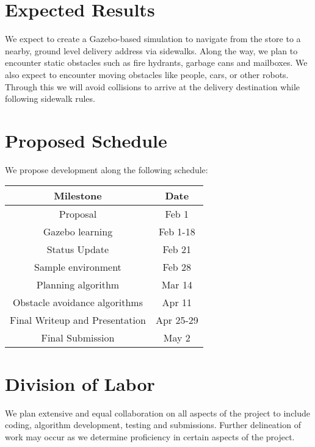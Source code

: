 \documentclass{article}
\begin{document}
\begin{multicols}{2}
\section*{Expected Results}
We expect to create a Gazebo-based simulation to navigate from the store to a nearby, ground level delivery address via sidewalks.  Along the way, we plan to encounter static obstacles such as fire hydrants, garbage cans and mailboxes.  We also expect to encounter moving obstacles like people, cars, or other robots.  Through this we will avoid collisions to arrive at the delivery destination while following sidewalk rules.

\section*{Proposed Schedule}
We propose development along the following schedule:

\begin{center}
\begin{tabular}{|cc|}
\hline
Milestone & Date  \\
\hline
Proposal  &  Feb 1 \\
Gazebo learning  &  Feb 1-18 \\
Status Update  &  Feb 21 \\
Sample environment & Feb 28\\
Planning algorithm & Mar 14\\
Obstacle avoidance algorithms & Apr 11\\
Final Writeup and Presentation & Apr 25-29\\
Final Submission  &  May 2 \\
\hline
\end{tabular}
\end{center}

\section*{Division of Labor}
We plan extensive and equal collaboration on all aspects of the project to include coding, algorithm development, testing and submissions. Further delineation of work may occur as we determine proficiency in certain aspects of the project.

\label{References}


\end{multicols}
\end{document}
